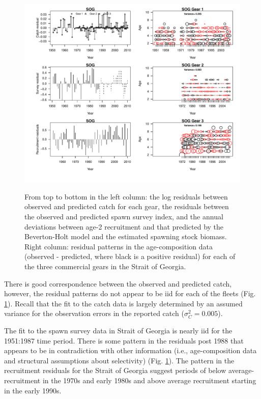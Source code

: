 \begin{figure}[!tbp]
	\includegraphics[width=\textwidth]{../FIGS/iscam_fig_HCAM_SOG_RES.pdf}\\
	\caption{From top to bottom in the left column: the log residuals between observed and predicted catch for each gear, the residuals between the observed and predicted spawn survey index, and the annual deviations between age-2 recruitment and that predicted by the Beverton-Holt model and the estimated spawning stock biomass. Right column: residual patterns in the age-composition data (observed - predicted, where black is a positive residual) for each of the three commercial gears in the Strait of Georgia.}\label{fig_HCAM_SOG_RES}
\end{figure}

There is good correspondence between the observed and predicted catch, however, the residual patterns do not appear to be iid for each of the fleets (Fig. \ref{fig_HCAM_SOG_RES}).  Recall that the fit to the catch data is largely determined by an assumed variance for the observation errors in the reported catch ($\sigma_C^2=0.005$).   

The fit to the spawn survey data in Strait of Georgia is nearly iid for the 1951:1987 time period.  There is some pattern in the residuals post 1988 that appears to be in contradiction with other information (i.e., age-composition data and structural assumptions about selectivity) (Fig. \ref{fig_HCAM_SOG_RES}).  The pattern in the recruitment residuals for the Strait of Georgia suggest periods of below average-recruitment in the 1970s and early 1980s and above average recruitment starting in the early 1990s.


